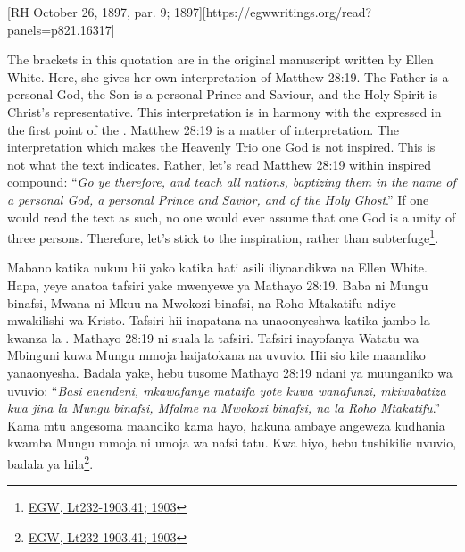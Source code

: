 [RH October 26, 1897, par. 9; 1897][https://egwwritings.org/read?panels=p821.16317]


The brackets in this quotation are in the original manuscript written by Ellen White. Here, she gives her own interpretation of Matthew 28:19. The Father is a personal God, the Son is a personal Prince and Saviour, and the Holy Spirit is Christ’s representative. This interpretation is in harmony with the  expressed in the first point of the . Matthew 28:19 is a matter of interpretation. The interpretation which makes the Heavenly Trio one God is not inspired. This is not what the text indicates. Rather, let's read Matthew 28:19 within inspired compound: “\textit{Go ye therefore, and teach all nations, baptizing them in the name of a personal God, a personal Prince and Savior, and of the Holy Ghost}.” If one would read the text as such, no one would ever assume that one God is a unity of three persons. Therefore, let's stick to the inspiration, rather than subterfuge\footnote{\href{https://egwwritings.org/?ref=en\_Lt232-1903.41&para=10197.50}{{EGW, Lt232-1903.41; 1903}}}.


Mabano katika nukuu hii yako katika hati asili iliyoandikwa na Ellen White. Hapa, yeye anatoa tafsiri yake mwenyewe ya Mathayo 28:19. Baba ni Mungu binafsi, Mwana ni Mkuu na Mwokozi binafsi, na Roho Mtakatifu ndiye mwakilishi wa Kristo. Tafsiri hii inapatana na  unaoonyeshwa katika jambo la kwanza la . Mathayo 28:19 ni suala la tafsiri. Tafsiri inayofanya Watatu wa Mbinguni kuwa Mungu mmoja haijatokana na uvuvio. Hii sio kile maandiko yanaonyesha. Badala yake, hebu tusome Mathayo 28:19 ndani ya muunganiko wa uvuvio: “\textit{Basi enendeni, mkawafanye mataifa yote kuwa wanafunzi, mkiwabatiza kwa jina la Mungu binafsi, Mfalme na Mwokozi binafsi, na la Roho Mtakatifu}.” Kama mtu angesoma maandiko kama hayo, hakuna ambaye angeweza kudhania kwamba Mungu mmoja ni umoja wa nafsi tatu. Kwa hiyo, hebu tushikilie uvuvio, badala ya hila\footnote{\href{https://egwwritings.org/?ref=en\_Lt232-1903.41&para=10197.50}{{EGW, Lt232-1903.41; 1903}}}.



